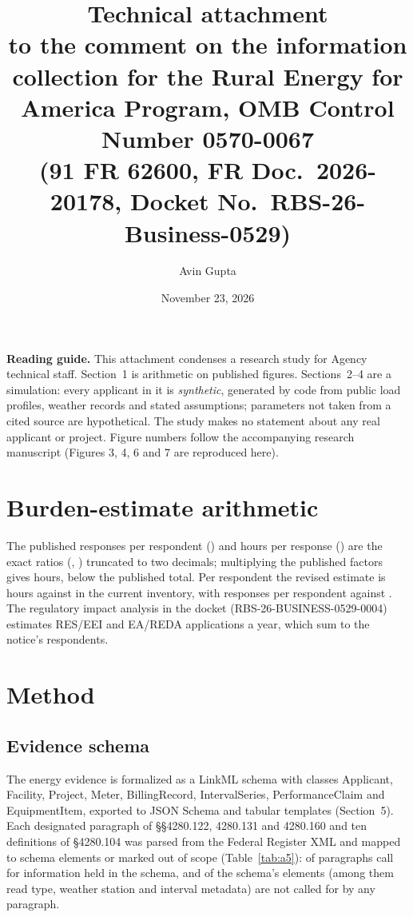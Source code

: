 \documentclass[10pt]{article}
\title{Technical attachment\\[4pt]\large to the comment on the information collection for
the Rural Energy for America Program, OMB Control Number 0570-0067\\
(91 FR 62600, FR Doc.\ 2026-20178, Docket No.\ RBS-26-Business-0529)}
\author{Avin Gupta}
\date{November 23, 2026}
\begin{document}
\maketitle

\textbf{Reading guide.} This attachment condenses a research study for Agency technical
staff. Section~1 is arithmetic on published figures. Sections~2--4 are a simulation: every
applicant in it is \emph{synthetic}, generated by code from public load profiles, weather
records and stated assumptions; parameters not taken from a cited source are hypothetical.
The study makes no statement about any real applicant or project. Figure numbers follow
the accompanying research manuscript (Figures 3, 4, 6 and 7 are reproduced here).

\section{Burden-estimate arithmetic}

\begin{table}[h]
\caption{Figures of the PRA notice (91 FR 62611), their products, and the current OMB
inventory. Observed regulatory data.}\label{tab:a1}
\centering\footnotesize

\end{table}

The published responses per respondent (\AuditResponsesPerRespondent) and hours per
response (\AuditHoursPerResponse) are the exact ratios (\AuditImpliedResponsesPerRespondent,
\AuditImpliedHoursPerResponse) truncated to two decimals; multiplying the published
factors gives \AuditChainedHours{} hours, \AuditChainedShortfall{} below the published
total. Per respondent the revised estimate is \AuditHoursPerRespondent{} hours against
\InvHoursPerRespondent{} in the current inventory, with
\AuditResponsesPerRespondent{} responses per respondent against
\InvResponsesPerRespondent. The regulatory impact analysis in the docket
(RBS-26-BUSINESS-0529-0004) estimates \RiaApplications{} RES/EEI and \RiaEaReda{} EA/REDA
applications a year, which sum to the notice's \RiaTotal{} respondents.

\section{Method}

\subsection{Evidence schema}
The energy evidence is formalized as a LinkML schema \cite{moxon2026linkml} with classes
Applicant, Facility, Project, Meter, BillingRecord, IntervalSeries, PerformanceClaim and
EquipmentItem, exported to JSON Schema and tabular templates (Section~5). Each designated
paragraph of \S\S4280.122, 4280.131 and 4280.160 and ten definitions of \S4280.104 was
parsed from the Federal Register XML and mapped to schema elements or marked out of scope
(Table~\ref{tab:a5}): \TraceEvidence{} of \TraceTotal{} paragraphs call for information
held in the schema, and \SchemaSlotsBeyondRule{} of the schema's \SchemaSlots{} elements
(among them read type, weather station and interval metadata) are not called for by any
paragraph.
\end{document}
